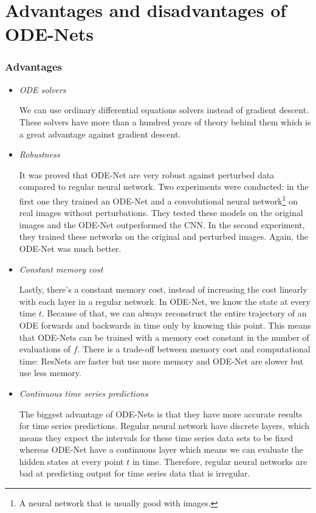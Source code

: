 \documentclass[10pt,a4paper]{article}
\theoremstyle{definition}
\theoremstyle{plain}
\begin{document}
\section{Advantages and disadvantages of ODE-Nets}

\subsubsection*{Advantages}
\begin{itemize}
\item \textit{ODE solvers}

We can use ordinary differential equations solvers instead of gradient descent. These solvers have more than a hundred years of theory behind them which is a great advantage against gradient descent.

\item \textit{Robustness} \cite{4}

It was proved that ODE-Net are very robust against perturbed data compared to regular neural network. Two experiments were conducted: in the first one they trained an ODE-Net and a convolutional neural network\footnote{A neural network that is usually good with images.} on real images without perturbations. They tested these models on the original images and the ODE-Net outperformed the CNN. In the second experiment, they trained these networks on the original and perturbed images. Again, the ODE-Net was much better.

\item \textit{Constant memory cost}

Lastly, there's a constant memory cost, instead of increasing the cost linearly with each layer in a regular network. 
In ODE-Net, we know the state at every time $t$. Because of that, we can always reconstruct the entire trajectory of an ODE forwards and backwards in time only by knowing this point. This means that ODE-Nets can be trained with a memory cost constant in the number of evaluations of $f$.
There is a trade-off between memory cost and computational time: ResNets are faster but use more memory and ODE-Net are slower but use less memory.

\item \textit{Continuous time series predictions}

The biggest advantage of ODE-Nets is that they have more accurate results for time series predictions. Regular neural network have discrete layers, which means they expect the intervals for these time series data sets to be fixed whereas ODE-Net have a continuous layer which means we can evaluate the hidden states at every point $t$ in time. Therefore, regular neural networks are bad at predicting output for time series data that is irregular.
\end{itemize}
\end{document}
